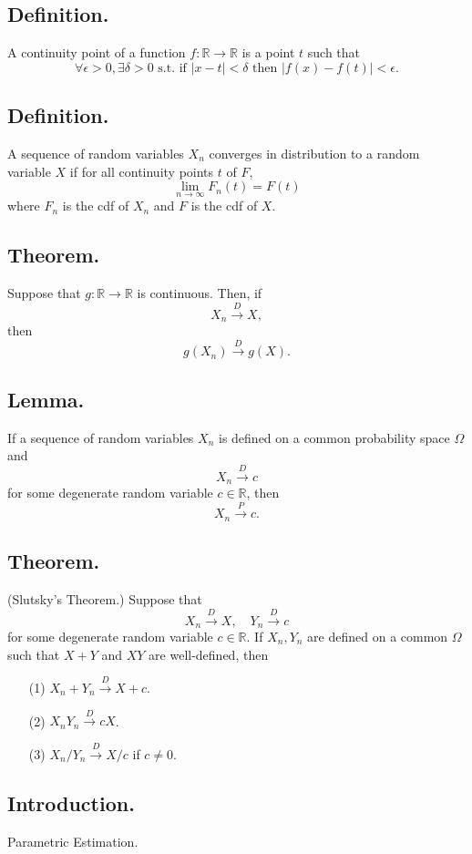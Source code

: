 \documentclass[titlepage]{article}
\begin{document}
\subsection{Definition.} A continuity point of a function $f: \mathbb{R} \to \mathbb{R}$ is a point $t$ such that 
$$\forall \epsilon > 0, \exists \delta > 0 \text{ s.t. if } |x - t| < \delta \text{ then } |f(x) - f(t)| < \epsilon.$$

\subsection{Definition.} A sequence of random variables $X_{n}$ converges in distribution to a random variable $X$ if for all continuity points $t$ of $F$, 
$$\lim_{n \to \infty}F_{n}(t) = F(t)$$
where $F_{n}$ is the cdf of $X_{n}$ and $F$ is the cdf of $X$.

\subsection{Theorem.} Suppose that $g: \mathbb{R} \to \mathbb{R}$ is continuous. Then, if 
$$X_{n} \xrightarrow{D} X,$$
then
$$g(X_{n}) \xrightarrow{D} g(X).$$

\subsection{Lemma.} If a sequence of random variables $X_{n}$ is defined on a common probability space $\Omega$ and 
$$X_{n} \xrightarrow{D} c$$
for some degenerate random variable $c \in \mathbb{R}$, then 
$$X_{n} \xrightarrow{P} c.$$

\subsection{Theorem.} (Slutsky's Theorem.) Suppose that 
$$X_{n} \xrightarrow{D} X, \quad Y_{n} \xrightarrow{D} c$$
for some degenerate random variable $c \in \mathbb{R}$. If $X_{n}, Y_{n}$ are defined on a common $\Omega$ such that $X+Y$ and $XY$ are well-defined, then 
\begin{enumerate}
\item[(1)] $X_{n} + Y_{n} \xrightarrow{D} X + c$.
\item[(2)] $X_{n}Y_{n} \xrightarrow{D} cX$.
\item[(3)] $X_{n}/Y_{n} \xrightarrow{D} X/c$ if $c \neq 0$.
\end{enumerate}

\newpage {}

\subsection{Introduction.} Parametric Estimation.
\end{document}
